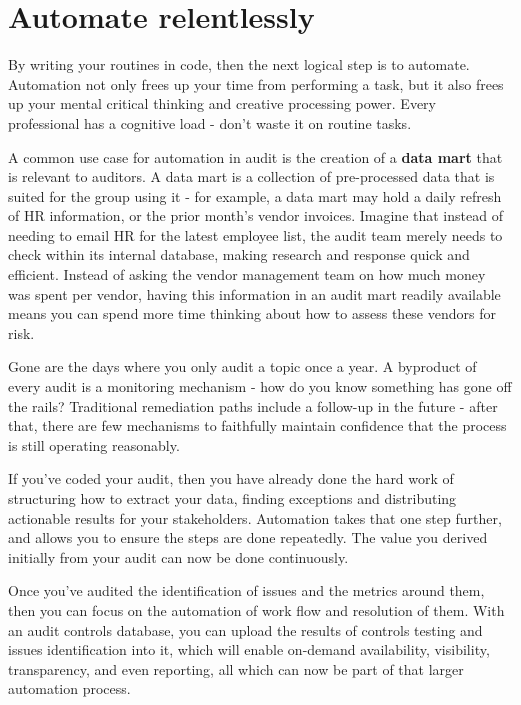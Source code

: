 \documentclass[
]{book}
\begin{document}
\hypertarget{automate-relentlessly}{%
\section{Automate relentlessly}\label{automate-relentlessly}}

By writing your routines in code, then the next logical step is to automate. Automation not only frees up your time from performing a task, but it also frees up your mental critical thinking and creative processing power. Every professional has a cognitive load - don't waste it on routine tasks.

A common use case for automation in audit is the creation of a \textbf{data mart} that is relevant to auditors. A data mart is a collection of pre-processed data that is suited for the group using it - for example, a data mart may hold a daily refresh of HR information, or the prior month's vendor invoices. Imagine that instead of needing to email HR for the latest employee list, the audit team merely needs to check within its internal database, making research and response quick and efficient. Instead of asking the vendor management team on how much money was spent per vendor, having this information in an audit mart readily available means you can spend more time thinking about how to assess these vendors for risk.

Gone are the days where you only audit a topic once a year. A byproduct of every audit is a monitoring mechanism - how do you know something has gone off the rails? Traditional remediation paths include a follow-up in the future - after that, there are few mechanisms to faithfully maintain confidence that the process is still operating reasonably.

If you've coded your audit, then you have already done the hard work of structuring how to extract your data, finding exceptions and distributing actionable results for your stakeholders. Automation takes that one step further, and allows you to ensure the steps are done repeatedly. The value you derived initially from your audit can now be done continuously.

Once you've audited the identification of issues and the metrics around them, then you can focus on the automation of work flow and resolution of them. With an audit controls database, you can upload the results of controls testing and issues identification into it, which will enable on-demand availability, visibility, transparency, and even reporting, all which can now be part of that larger automation process.
\end{document}

